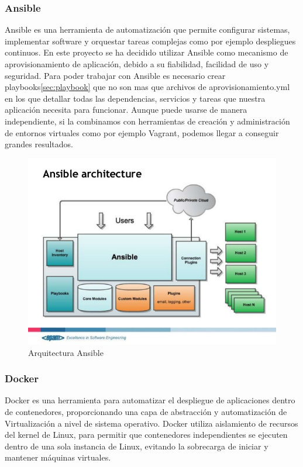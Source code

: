 \documentclass[a4paper,11pt]{book}
\begin{document}
\subsubsection{Ansible}

Ansible\cite{ans} es una herramienta de automatización que permite configurar sistemas, implementar software y orquestar tareas complejas como por ejemplo despliegues continuos. En este proyecto se ha decidido utilizar Ansible como mecanismo de aprovisionamiento de aplicación, debido a su fiabilidad, facilidad de uso y seguridad. Para poder trabajar con Ansible es necesario crear playbooks\ref{sec:playbook} que no son mas que archivos de aprovisionamiento.yml en los que detallar todas las dependencias, servicios y tareas que nuestra aplicación necesita para funcionar. Aunque puede usarse de manera independiente, si la combinamos con herramientas de creación y administración de entornos virtuales como por ejemplo Vagrant, podemos llegar a conseguir grandes resultados.

\begin{figure}[H] 
\centering 
\includegraphics[scale=0.35]{imagenes/desarrollo_herramienta/ansible.jpg}
\caption{ Arquitectura Ansible\cite{ans2}}
\end{figure}



\subsubsection{Docker}

Docker\cite{dk} es una herramienta para automatizar el despliegue de aplicaciones dentro de contenedores, proporcionando una capa de abstracción y automatización de Virtualización a nivel de sistema operativo. Docker utiliza aislamiento de recursos del kernel de Linux, para permitir que contenedores independientes se ejecuten dentro de una sola instancia de Linux, evitando la sobrecarga de iniciar y mantener máquinas virtuales.
\end{document}
